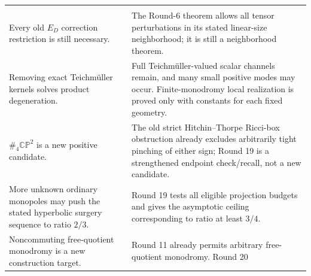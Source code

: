 \documentclass[
  10pt,
]{article}
\begin{document}
\begin{longtable}[]{@{}>{\raggedright\arraybackslash}p{\dimexpr(\linewidth-2\tabcolsep)/2\relax}>{\raggedright\arraybackslash}p{\dimexpr(\linewidth-2\tabcolsep)/2\relax}@{}}
\begin{minipage}[t]{0.47\columnwidth}
\end{minipage}\tabularnewline
\begin{minipage}[t]{0.47\columnwidth}\raggedright
Every old \(E_D\) correction restriction is still necessary.\strut
\end{minipage} & \begin{minipage}[t]{0.47\columnwidth}\raggedright
The Round-6 theorem allows all tensor perturbations in its stated
linear-size neighborhood; it is still a neighborhood theorem.\strut
\end{minipage}\tabularnewline
\begin{minipage}[t]{0.47\columnwidth}\raggedright
Removing exact Teichmüller kernels solves product degeneration.\strut
\end{minipage} & \begin{minipage}[t]{0.47\columnwidth}\raggedright
Full Teichmüller-valued scalar channels remain, and many small positive
modes may occur. Finite-monodromy local realization is proved only with
constants for each fixed geometry.\strut
\end{minipage}\tabularnewline
\begin{minipage}[t]{0.47\columnwidth}\raggedright
\(\#_4\mathbb{CP}^2\) is a new positive candidate.\strut
\end{minipage} & \begin{minipage}[t]{0.47\columnwidth}\raggedright
The old strict Hitchin--Thorpe Ricci-box obstruction already excludes
arbitrarily tight pinching of either sign; Round 19 is a strengthened
endpoint check/recall, not a new candidate.\strut
\end{minipage}\tabularnewline
\begin{minipage}[t]{0.47\columnwidth}\raggedright
More unknown ordinary monopoles may push the stated hyperbolic surgery
sequence to ratio \(2/3\).\strut
\end{minipage} & \begin{minipage}[t]{0.47\columnwidth}\raggedright
Round 19 tests all eligible projection budgets and gives the asymptotic
ceiling corresponding to ratio at least \(3/4\).\strut
\end{minipage}\tabularnewline
\begin{minipage}[t]{0.47\columnwidth}\raggedright
Noncommuting free-quotient monodromy is a new construction target.\strut
\end{minipage} & \begin{minipage}[t]{0.47\columnwidth}\raggedright
Round 11 already permits arbitrary free-quotient monodromy. Round 20

\end{minipage}
\end{longtable}
\end{document}
